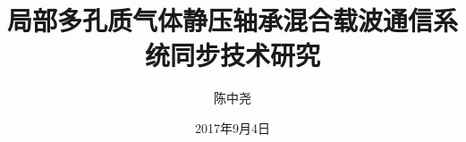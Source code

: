 
\subject{信息与通信工程}
\author{陈中尧}
\date{2017年9月4日}

\ifxueweidoctor
  \title{局部多孔质气体静压轴承} %
\fi
\ifxueweimaster
  \title{混合载波通信系统同步技术研究}
\fi

\makecover
\clearpage
\setcounter{page}{1}